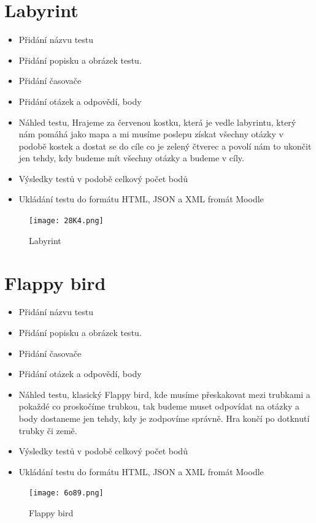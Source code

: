 \documentclass[12pt, a4paper, twoside, openright]{report}
\begin{document}
\section{Labyrint}
\begin{itemize}
		\item Přidání názvu testu
		\item Přidání popisku a obrázek testu.
		\item Přidání časovače
            \item Přidání otázek a odpovědí, body
            \item Náhled testu, Hrajeme za červenou kostku, která je vedle labyrintu, který nám pomáhá jako mapa a mi musíme poslepu získat všechny otázky v podobě kostek a dostat se do cíle co je zelený čtverec a povolí nám to ukončit jen tehdy, kdy budeme mít všechny otázky a budeme v cíly.
            \item Výsledky testů v podobě celkový počet bodů
            \item Ukládání testu do formátu HTML, JSON a XML fromát Moodle
	\end{itemize}

    \begin{figure}[h]
		\centering
		\texttt{[image: 28K4.png]}
		\caption{Labyrint}
		\label{fig:architecture}
	\end{figure}

	\section{Flappy bird}
\begin{itemize}
		\item Přidání názvu testu
		\item Přidání popisku a obrázek testu.
		\item Přidání časovače
            \item Přidání otázek a odpovědí, body
            \item Náhled testu, klasický Flappy bird, kde musíme přeskakovat mezi trubkami a pokaždé co proskočíme trubkou, tak budeme muset odpovídat na otázky a body dostaneme jen tehdy, kdy je zodpovíme správně. Hra končí po dotknutí trubky či země.
            \item Výsledky testů v podobě celkový počet bodů
            \item Ukládání testu do formátu HTML, JSON a XML fromát Moodle
	\end{itemize}

    \begin{figure}[h]
		\centering
		\texttt{[image: 6o89.png]}
		\caption{Flappy bird}
		\label{fig:architecture}
	\end{figure}
\end{document}
